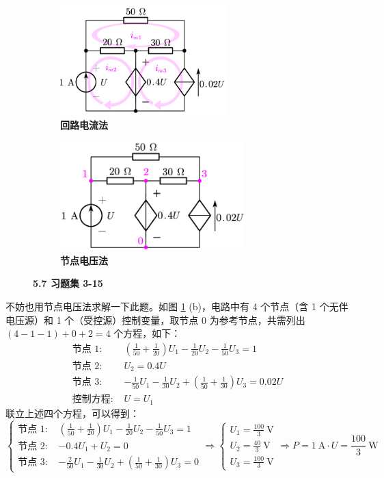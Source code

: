 \documentclass[UTF8]{report}
\theoremstyle{MyLineTheoremStyle} %
\theoremstyle{MyBlockTheoremStyle} %
\theoremstyle{MySubsubsectionStyle} %
\begin{document}
\begin{figure}[H]\centering
\begin{subfigure}[t]{0.5\columnwidth}\centering
    \includegraphics[height=120pt]{assets/5/5.7 (1).png}
    \caption{\bfseries 回路电流法 }
\end{subfigure}\hfill
\begin{subfigure}[t]{0.5\columnwidth}\centering
    \includegraphics[height=120pt]{assets/5/5.7 (2).png}
    \caption{\bfseries 节点电压法 }
\end{subfigure}
\caption{\bfseries 5.7 习题集 3-15 }\label{5.7 习题集 3-15}
\end{figure}

不妨也用节点电压法求解一下此题。如图 \ref{5.7 习题集 3-15} (b)，电路中有 4 个节点（含 1 个无伴电压源）和 1 个（受控源）控制变量，取节点 0 为参考节点，共需列出 $ (4 - 1 - 1) + 0 + 2 = 4$ 个方程，如下：
\begin{align}
\text{节点 1: } & \left(\frac{1}{50} + \frac{1}{20}\right) U_1 - \frac{1}{20}U_2 - \frac{1}{50}U_3 = 1 \\ 
\text{节点 2: } & U_2 = 0.4 U \\
\text{节点 3: } & - \frac{1}{50}U_1 - \frac{1}{30}U_2 + \left(\frac{1}{50} + \frac{1}{30}\right)U_3 = 0.02 U \\ 
\text{控制方程: } & U = U_1
\end{align}
联立上述四个方程，可以得到：
\begin{equation}
\begin{cases}
    \text{节点 1: } & \left(\frac{1}{50} + \frac{1}{20}\right) U_1 - \frac{1}{20}U_2 - \frac{1}{50}U_3 = 1 \\ 
    \text{节点 2: } & -0.4 U_1 + U_2 = 0 \\
    \text{节点 3: } & - \frac{2}{50}U_1 - \frac{1}{30}U_2 + \left(\frac{1}{50} + \frac{1}{30}\right)U_3 = 0
\end{cases}
\Longrightarrow 
\begin{cases}
    U_1 = \frac{100}{3} \ \mathrm{V}\\ 
    U_2 = \frac{40}{3} \ \mathrm{V}\\ 
    U_3 = \frac{100}{3} \ \mathrm{V}
\end{cases}
\Longrightarrow P = 1 \ \mathrm{A}\cdot U = \frac{100}{3} \ \mathrm{W}
\end{equation}
\end{document}
